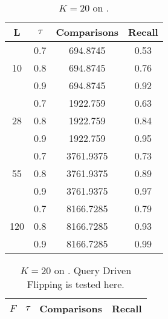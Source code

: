 \documentclass[11pt]{article}
\begin{document}
\begin{table}
\centering
\begin{tabular}{|c|c|c|c|}
\hline
L & $\tau$ & Comparisons & Recall \\ 
\hline
\multirow{3}{*}{10} & 0.7 & 694.8745 & 0.53 \\
 & 0.8 & 694.8745 & 0.76 \\
 & 0.9 & 694.8745 & 0.92 \\
\hline 
\multirow{3}{*}{28} & 0.7 & 1922.759 & 0.63 \\
 & 0.8 & 1922.759 & 0.84 \\
 & 0.9 & 1922.759 & 0.95 \\
\hline 
\multirow{3}{*}{55} & 0.7 & 3761.9375 & 0.73 \\
 & 0.8 & 3761.9375 & 0.89 \\
 & 0.9 & 3761.9375 & 0.97 \\
\hline 
\multirow{3}{*}{120} & 0.7 & 8166.7285 & 0.79 \\
 & 0.8 & 8166.7285 & 0.93 \\
 & 0.9 & 8166.7285 & 0.99 \\
\hline 
 \end{tabular}
\caption{\footnotesize{$K=20$ on \dataB.}}
\label{tab:data-so}
\end{table}



\begin{table}
\centering
\small 
{
\begin{tabular}{|c|c|c|c|}
\hline
$F$ & $\tau$ & Comparisons & Recall \\ 
\hline
\hline 
\end{tabular}
\caption{$K=20$ on \dataB. Query Driven Flipping is tested here.}
}
\label{tab:big:queryDriven}
\end{table}
\end{document}
